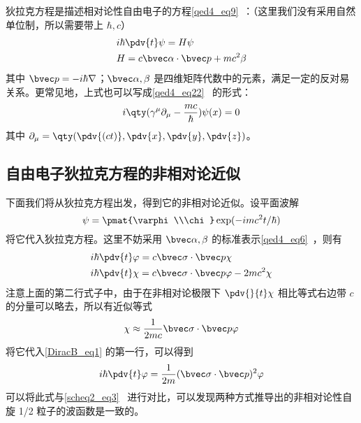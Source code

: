 

狄拉克方程是描述相对论性自由电子的方程\autoref{qed4_eq9}~：（这里我们没有采用自然单位制，所以需要带上 $\hbar,c$）
\begin{equation}
\begin{aligned}
&i\hbar \pdv{t} \psi = H\psi\\
&H=c\bvec \alpha\cdot \bvec p+mc^2\beta
\end{aligned}
\end{equation}
其中 $\bvec p=-i\hbar\nabla$；$\bvec \alpha,\beta$ 是四维矩阵代数中的元素，满足一定的反对易关系。更常见地，上式也可以写成\autoref{qed4_eq22}~ 的形式：
\begin{equation}
i\qty(\gamma^\mu \partial_\mu-\frac{mc}{\hbar})\psi(x)=0
\end{equation}
其中 $\partial_\mu=\qty(\pdv{(ct)},\pdv{x},\pdv{y},\pdv{z})$。

\subsection{自由电子狄拉克方程的非相对论近似}

下面我们将从狄拉克方程出发，得到它的非相对论近似。设平面波解
\begin{equation}
\psi=\pmat{\varphi\\\chi}\exp(-imc^2t/\hbar)
\end{equation}
将它代入狄拉克方程。这里不妨采用 $\bvec \alpha,\beta$ 的标准表示\autoref{qed4_eq6}~，则有
\begin{equation}\label{DiracB_eq1}
\begin{aligned}
&i\hbar\pdv{t} \varphi=c\bvec \sigma\cdot \bvec p \chi\\
&i\hbar\pdv{t} \chi = c\bvec \sigma\cdot \bvec p \varphi -2mc^2 \chi 
\end{aligned}
\end{equation}
注意上面的第二行式子中，由于在非相对论极限下 $\pdv{}{t} \chi$ 相比等式右边带 $c$ 的分量可以略去，所以有近似等式
\begin{equation}\label{DiracB_eq4}
\chi\approx \frac{1}{2mc} \bvec \sigma\cdot \bvec p \varphi
\end{equation}
将它代入\autoref{DiracB_eq1} 的第一行，可以得到
\begin{equation}\label{DiracB_eq2}
i\hbar\pdv{t} \varphi=\frac{1}{2m}(\bvec \sigma\cdot \bvec p)^2 \varphi
\end{equation}
可以将此式与\autoref{scheq2_eq3}~ 进行对比，可以发现两种方式推导出的非相对论性自旋 1/2 粒子的波函数是一致的。

